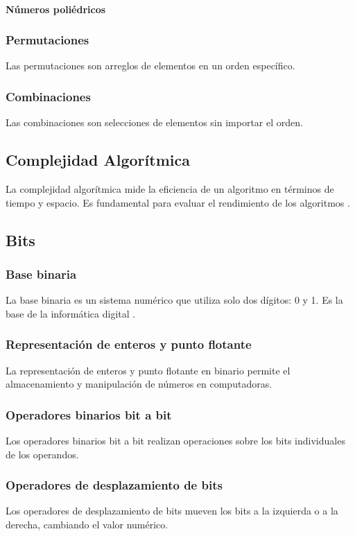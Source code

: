 \paragraph{Números poliédricos}
\subsubsection{Permutaciones}
Las permutaciones son arreglos de elementos en un orden específico.
\subsubsection{Combinaciones}
Las combinaciones son selecciones de elementos sin importar el orden.

\subsection{Complejidad Algorítmica}
La complejidad algorítmica mide la eficiencia de un algoritmo en términos de tiempo y espacio. Es fundamental para evaluar el rendimiento de los algoritmos \cite{skiena2008algorithm}.

\subsection{Bits}
\subsubsection{Base binaria}
La base binaria es un sistema numérico que utiliza solo dos dígitos: 0 y 1. Es la base de la informática digital \cite{gaddis2018starting}.
\subsubsection{Representación de enteros y punto flotante}
La representación de enteros y punto flotante en binario permite el almacenamiento y manipulación de números en computadoras.
\subsubsection{Operadores binarios bit a bit}
Los operadores binarios bit a bit realizan operaciones sobre los bits individuales de los operandos.
\subsubsection{Operadores de desplazamiento de bits}
Los operadores de desplazamiento de bits mueven los bits a la izquierda o a la derecha, cambiando el valor numérico.
